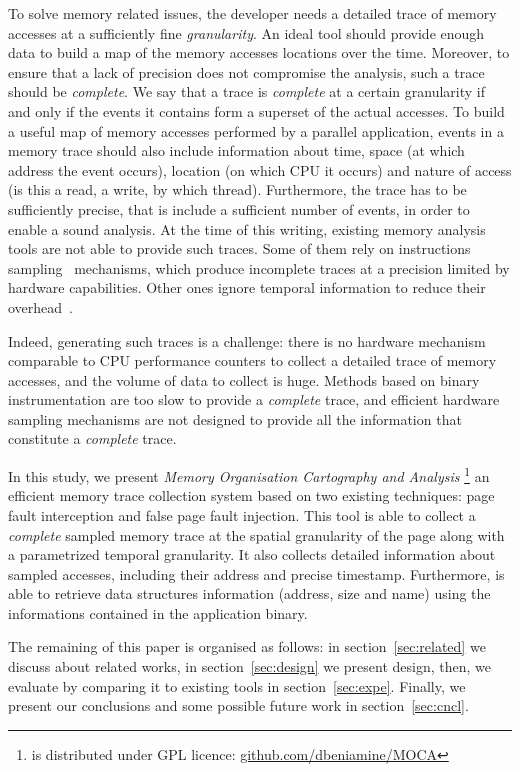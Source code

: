 To solve memory related issues, the developer needs a detailed trace of memory
accesses at a sufficiently fine \emph{granularity}.
An ideal tool should provide enough data to build a map of the memory accesses locations over the time.
Moreover, to ensure that a lack of precision
does not compromise the analysis, such a trace should be \emph{complete}. We say that a trace is
\emph{complete} at a certain granularity if and only if the events it contains
form a superset of the actual accesses. To build a useful map of memory accesses performed by a parallel application, 
events in a memory trace should also
include information about time, space (at which address the event occurs),
location (on which CPU it occurs) and nature of access (is this
a read, a write, by which thread).
Furthermore, the trace has to be sufficiently precise, that is include a sufficient number of events, in order to enable a sound analysis.
At the time of this writing, existing memory analysis tools are not able to provide such traces.
Some of them rely on instructions sampling~\cite{Liu14Tool,Lachaize12MemProf}
mechanisms, which produce incomplete traces at a precision limited by hardware capabilities. Other ones ignore temporal information to reduce their
overhead~\cite{Beniamine15TABARNACRR}.

Indeed, generating such traces is a challenge: there is no hardware mechanism
comparable to CPU performance counters to collect a detailed trace of memory accesses, and the volume
of data to collect is huge. Methods based on binary instrumentation are too slow
to provide a \emph{complete} trace, and efficient hardware sampling mechanisms are not designed
to provide all the information that constitute a \emph{complete} trace.

In this study, we present \emph{Memory Organisation Cartography and Analysis}
\footnote{\Moca is distributed under GPL licence:
    \href{https://github.com/dbeniamine/MOCA}{github.com/dbeniamine/MOCA}}
an efficient memory trace collection system based on two existing techniques:
page fault interception and false page fault injection.
This tool is able to collect a \emph{complete} sampled memory trace at
the spatial granularity of the page along with a parametrized temporal granularity.
It also collects detailed information about sampled accesses, including their address and
precise timestamp. Furthermore, \Moca is able to retrieve data structures
information (address, size and name) using the informations contained in the application binary.

The remaining of this paper is organised as follows: in section~\ref{sec:related}
we discuss about related works, in section~\ref{sec:design} we present \Moca design, then,
we evaluate \Moca by comparing it to existing tools in section~\ref{sec:expe}.
Finally, we present our conclusions and some possible future work in
section~\ref{sec:cncl}.
